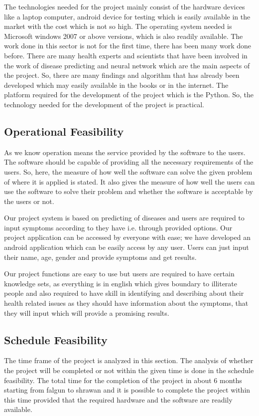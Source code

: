 The technologies needed for the project mainly consist of the hardware devices like a laptop computer, android device for testing which is 
easily available in the market with the cost which is not so high. The operating system needed is Microsoft windows 2007 or above versions,
which is also readily available. The work done in this sector is not for the first time, there has been many work done before. There are many health experts and scientists that have been involved in the work of disease predicting and neural network which are the main aspects of the project. So, there are many findings and algorithm that has already been developed which may easily available in the books or in the internet. The platform required for the development of the project which is the Python. So, the technology needed for the development of the project 
is practical.

\subsection{Operational Feasibility}
As we know operation means the service provided by the software to the users. The software should be capable of providing all the necessary requirements of the users. So, here, the measure of how well the software can solve the given problem of where it is applied is stated. It also gives the measure of how well the users can use the software to solve their problem and whether the software is acceptable by the users or not.\par
Our project system is based on predicting of diseases and users are required to input symptoms according to they have i.e. through provided options. Our project application can be accessed by everyone with ease; we have developed an android application which can be easily access by any user. Users can just input their name, age, gender and provide symptoms and get results.

Our project functions are easy to use but users are required to have certain knowledge sets, as everything is 
in english which gives boundary to illiterate people and also required to have skill in identifying and describing about their health related issues as they should have information about the symptoms, that they will input which will provide a promising results.

\subsection{Schedule Feasibility}
The time frame of the project is analyzed in this section. The analysis of whether the project will be completed or not within the given time is done in the schedule feasibility. The total time for the completion of the project in about 6 months starting from falgun to shrawan and it is possible to complete the project within this time provided that the required hardware and the software are readily available.


